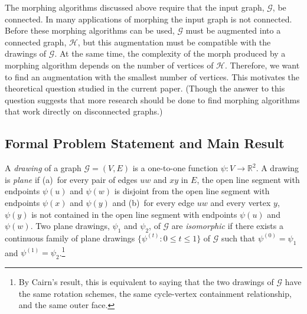 \documentclass[11pt]{patmorin}
\newcommand{\R}{\mathbb{R}}
\begin{document}
The morphing algorithms discussed above require that the input graph,
$\mathcal{G}$, be connected. In many applications of morphing 
the input graph is not connected. Before
these morphing algorithms can be used, $\mathcal{G}$ must be augmented
into a connected graph, $\mathcal H$, but this augmentation must be
compatible with the drawings of $\mathcal{G}$.  At the same time, the
complexity of the morph produced by a morphing algorithm depends on
the number of vertices of $\mathcal H$.  Therefore, we want to find an
augmentation with the smallest number of vertices.  This motivates the
theoretical question studied in the current paper. (Though the answer
to this question suggests that more research should be done to find
morphing algorithms that work directly on disconnected graphs.)




\subsection{Formal Problem Statement and Main Result}

A \emph{drawing} of a graph $\mathcal{G}=(V,E)$ is a one-to-one
function $\psi\colon V\to\R^2$.  A drawing is \emph{plane} if (a)~for
every pair of edges $uw$ and $xy$ in $E$, the open line segment with
endpoints $\psi(u)$ and $\psi(w)$ is disjoint from the open line
segment with endpoints $\psi(x)$ and $\psi(y)$ and (b)~for every edge
$uw$ and every vertex $y$, $\psi(y)$ is not contained in the open line
segment with endpoints $\psi(u)$ and $\psi(w)$.  Two plane drawings,
$\psi_1$ and $\psi_2$, of $\mathcal{G}$ are \emph{isomorphic} if
there exists a continuous family of plane drawings $\{\psi^{(t)}
\colon 0\le t\le 1\}$ of $\mathcal{G}$ such that $\psi^{(0)}=\psi_1$
and $\psi^{(1)}=\psi_2$.\footnote{By Cairn's result, this is equivalent
to saying that the two drawings of $\mathcal{G}$ have the same rotation schemes,
the same cycle-vertex containment relationship, and the same outer face.}
\end{document}
